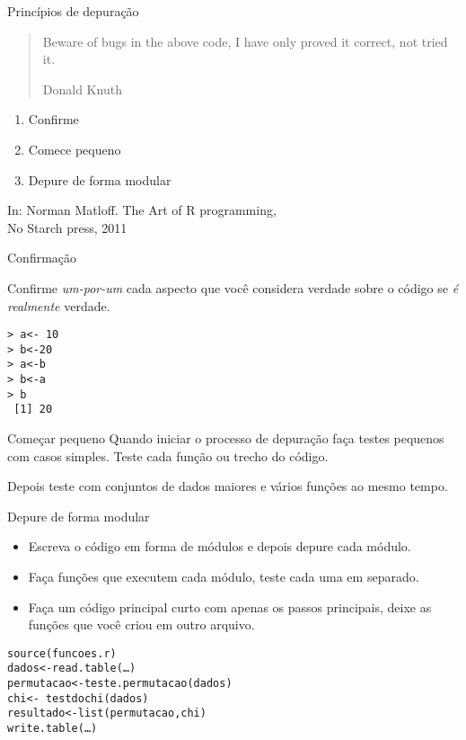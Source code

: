 \documentclass[handout]{beamer}
\begin{document}
\begin{frame}{Princípios de depuração}
  \begin{quote}
    Beware of bugs in the above code, I have only proved it correct, not tried it.\\
    \begin{flushright}
      Donald Knuth
    \end{flushright}
  \end{quote}
  \begin{enumerate}
  \item Confirme
  \item Comece pequeno
  \item Depure de forma modular
  \end{enumerate}
  \begin{flushright}
    In: Norman Matloff. The Art of R programming,\\ No Starch press, 2011
  \end{flushright}
\end{frame}

\begin{frame}{Confirmação}
 
Confirme \textit{um-por-um} cada aspecto que você considera verdade sobre o código se \textit{é realmente} verdade.

\texttt{> a<- 10 \\
> b<-20 \\
> a<-b\\
> b<-a\\ \pause
> b \\
~[1] 20}
  \end{frame}

  \begin{frame}{Começar pequeno}
Quando iniciar o processo de depuração faça testes pequenos com casos simples. Teste cada função ou trecho do código. \\ \pause

Depois teste com conjuntos de dados maiores e vários funções ao mesmo tempo. 
   \end{frame}

   \begin{frame}{Depure de forma modular}

     \begin{itemize}[<+->]
     \item Escreva o código em forma de módulos e depois depure cada
       módulo.
     \item Faça funções que executem cada módulo, teste cada uma
       em separado.
     \item Faça um código principal curto com apenas os
       passos principais, deixe as funções que você criou em outro
       arquivo.
     \end{itemize}
\pause

\texttt{source(funcoes.r)\\
 dados<-read.table(\dots)\\
 permutacao<-teste.permutacao(dados)\\
 chi<- testdochi(dados)\\
 resultado<-list(permutacao,chi)\\
 write.table(\dots)
}
     
   \end{frame}
\end{document}
